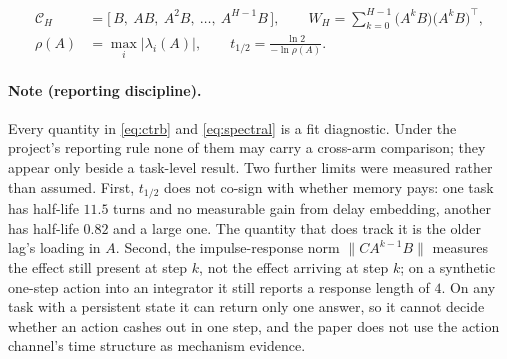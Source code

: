 \begin{align}
  \mathcal{C}_H &= \bigl[\,B,\ AB,\ A^2B,\ \dots,\ A^{H-1}B\,\bigr],
  \qquad
  W_H = \sum_{k=0}^{H-1} \bigl(A^k B\bigr)\bigl(A^k B\bigr)^{\!\top},
  \label{eq:ctrb}\\[4pt]
  \rho(A) &= \max_i \lvert \lambda_i(A) \rvert,
  \qquad
  t_{1/2} = \frac{\ln 2}{-\ln \rho(A)}.
  \label{eq:spectral}
\end{align}

\paragraph{Note (reporting discipline).}
Every quantity in \eqref{eq:ctrb} and \eqref{eq:spectral} is a fit diagnostic. Under the
project's reporting rule none of them may carry a cross-arm comparison; they appear only
beside a task-level result. Two further limits were measured rather than assumed. First,
$t_{1/2}$ does not co-sign with whether memory pays: one task has half-life $11.5$ turns and
no measurable gain from delay embedding, another has half-life $0.82$ and a large one. The
quantity that does track it is the older lag's loading in $A$. Second, the impulse-response
norm $\lVert C A^{k-1} B \rVert$ measures the effect still present at step $k$, not the effect
arriving at step $k$; on a synthetic one-step action into an integrator it still reports a
response length of $4$. On any task with a persistent state it can return only one answer, so
it cannot decide whether an action cashes out in one step, and the paper does not use the
action channel's time structure as mechanism evidence.

